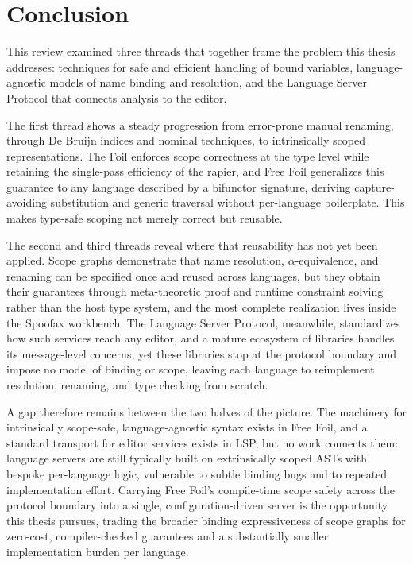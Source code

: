 \section{Conclusion}

This review examined three threads that together frame the problem this thesis addresses: techniques for safe and efficient handling of bound variables, language-agnostic models of name binding and resolution, and the Language Server Protocol that connects analysis to the editor.

The first thread shows a steady progression from error-prone manual renaming, through De Bruijn indices and nominal techniques, to intrinsically scoped representations. The Foil enforces scope correctness at the type level while retaining the single-pass efficiency of the rapier, and Free Foil generalizes this guarantee to any language described by a bifunctor signature, deriving capture-avoiding substitution and generic traversal without per-language boilerplate. This makes type-safe scoping not merely correct but reusable.

The second and third threads reveal where that reusability has not yet been applied. Scope graphs demonstrate that name resolution, $\alpha$-equivalence, and renaming can be specified once and reused across languages, but they obtain their guarantees through meta-theoretic proof and runtime constraint solving rather than the host type system, and the most complete realization lives inside the Spoofax workbench. The Language Server Protocol, meanwhile, standardizes how such services reach any editor, and a mature ecosystem of libraries handles its message-level concerns, yet these libraries stop at the protocol boundary and impose no model of binding or scope, leaving each language to reimplement resolution, renaming, and type checking from scratch.

A gap therefore remains between the two halves of the picture. The machinery for intrinsically scope-safe, language-agnostic syntax exists in Free Foil, and a standard transport for editor services exists in LSP, but no work connects them: language servers are still typically built on extrinsically scoped ASTs with bespoke per-language logic, vulnerable to subtle binding bugs and to repeated implementation effort. Carrying Free Foil's compile-time scope safety across the protocol boundary into a single, configuration-driven server is the opportunity this thesis pursues, trading the broader binding expressiveness of scope graphs for zero-cost, compiler-checked guarantees and a substantially smaller implementation burden per language.
